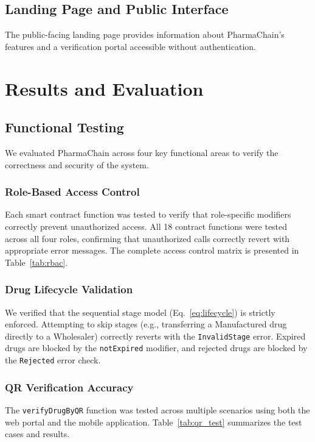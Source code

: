 \documentclass[conference]{IEEEtran}
\begin{document}
\subsection{Landing Page and Public Interface}

The public-facing landing page provides information about PharmaChain's features and a verification portal accessible without authentication.



\section{Results and Evaluation}

\subsection{Functional Testing}

We evaluated PharmaChain across four key functional areas to verify the correctness and security of the system.

\subsubsection{Role-Based Access Control}
Each smart contract function was tested to verify that role-specific modifiers correctly prevent unauthorized access. All 18 contract functions were tested across all four roles, confirming that unauthorized calls correctly revert with appropriate error messages. The complete access control matrix is presented in Table~\ref{tab:rbac}.

\subsubsection{Drug Lifecycle Validation}
We verified that the sequential stage model (Eq.~\ref{eq:lifecycle}) is strictly enforced. Attempting to skip stages (e.g., transferring a Manufactured drug directly to a Wholesaler) correctly reverts with the \texttt{InvalidStage} error. Expired drugs are blocked by the \texttt{notExpired} modifier, and rejected drugs are blocked by the \texttt{Rejected} error check.


\subsubsection{QR Verification Accuracy}
The \texttt{verifyDrugByQR} function was tested across multiple scenarios using both the web portal and the mobile application. Table~\ref{tab:qr_test} summarizes the test cases and results.
\end{document}

